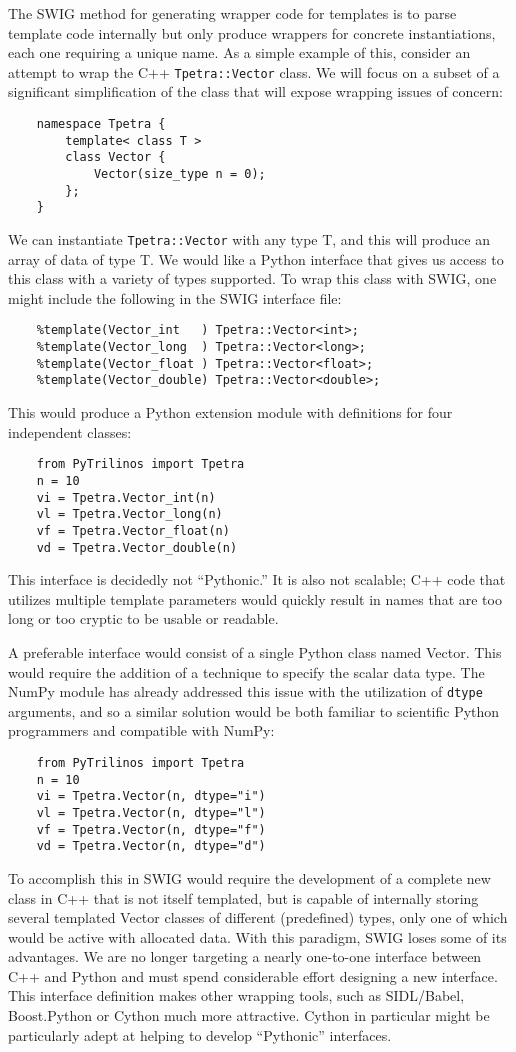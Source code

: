 \documentclass[11pt]{article}
\begin{document}
The SWIG method for generating wrapper code for templates is to parse template code internally but only produce wrappers for concrete instantiations, each one requiring a unique name.  As a simple example of this, consider an attempt to wrap the C++ {\tt Tpetra::Vector} class.  We will focus on a subset of a significant simplification of the class that will expose wrapping issues of concern:
\begin{verbatim}
    namespace Tpetra {
        template< class T >
        class Vector {
            Vector(size_type n = 0);
        };
    }
\end{verbatim}
We can instantiate {\tt Tpetra::Vector} with any type T, and this will produce an array of data of type T.  We would like a Python interface that gives us access to this class with a variety of types supported.  To wrap this class with SWIG, one might include the following in the SWIG interface file:
\begin{verbatim}
    %template(Vector_int   ) Tpetra::Vector<int>;
    %template(Vector_long  ) Tpetra::Vector<long>;
    %template(Vector_float ) Tpetra::Vector<float>;
    %template(Vector_double) Tpetra::Vector<double>;
\end{verbatim}
This would produce a Python extension module with definitions for four independent classes:
\begin{verbatim}
    from PyTrilinos import Tpetra
    n = 10
    vi = Tpetra.Vector_int(n)
    vl = Tpetra.Vector_long(n)
    vf = Tpetra.Vector_float(n)
    vd = Tpetra.Vector_double(n)
\end{verbatim}
This interface is decidedly not ``Pythonic.''  It is also not scalable; C++ code that utilizes multiple template parameters would quickly result in names that are too long or too cryptic to be usable or readable.

A preferable interface would consist of a single Python class named Vector.  This would require the addition of a technique to specify the scalar data type.  The NumPy module has already addressed this issue with the utilization of {\tt dtype} arguments, and so a similar solution would be both familiar to scientific Python programmers and compatible with NumPy:
\begin{verbatim}
    from PyTrilinos import Tpetra
    n = 10
    vi = Tpetra.Vector(n, dtype="i")
    vl = Tpetra.Vector(n, dtype="l")
    vf = Tpetra.Vector(n, dtype="f")
    vd = Tpetra.Vector(n, dtype="d")
\end{verbatim}
To accomplish this in SWIG would require the development of a complete new class in C++ that is not itself templated, but is capable of internally storing several templated Vector classes of different (predefined) types, only one of which would be active with allocated data.  With this paradigm, SWIG loses some of its advantages.  We are no longer targeting a nearly one-to-one interface between C++ and Python and must spend considerable effort designing a new interface.  This interface definition makes other wrapping tools, such as SIDL/Babel, Boost.Python or Cython much more attractive.  Cython in particular might be particularly adept at helping to develop ``Pythonic'' interfaces.
\end{document}

